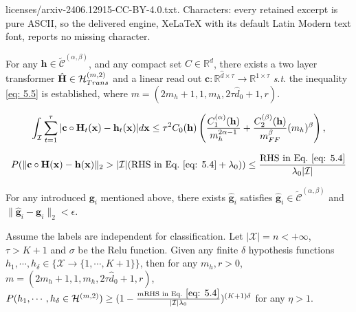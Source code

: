 \documentclass[10pt,a4paper]{amsart}
\begin{document}
licenses/arxiv-2406.12915-CC-BY-4.0.txt. Characters: every retained excerpt is pure ASCII, so the delivered engine, XeLaTeX with its default Latin Modern text font, reports no missing character.
\begin{lemma}
    For any $\mathbf{h}\in \widetilde{\mathcal{C}}^{(\alpha, \beta)}$, and any compact set $C\in \mathbb{R}^d$, there exists a two layer transformer $\hat{\mathbf{H}} \in \mathcal{H}_{\rm Trans}^{(m,2)}$ and a linear read out $\mathbf{c}:\mathbb{R}^{\hat{d}\times \tau}\xrightarrow{}\mathbb{R}^{1\times \tau}$ \textit{s}.\textit{t}. the inequality \eqref{eq: 5.5} is established,
    where $m=(2m_h+1,1,m_h,2\tau \hat{d}_0+1,r)$.
    \label{Jackson lemma1}
\end{lemma}

    \begin{equation}        \int_{\mathcal{I}}\sum_{t=1}^{\tau}|\mathbf{c}\circ\mathbf{H}_t(\mathbf{x})-\mathbf{h}_t(\mathbf{x})|d\mathbf{x}
        \leq \tau^2 C_0(\mathbf{h} )
        \left(\frac{C_1^{(\alpha)}(\mathbf{h} )}{m_h^{2\alpha-1}}+\frac{C_2^{(\beta )}(\mathbf{h})}{m_{\rm FF}^{\beta}}(m_h)^{\beta}\right),
        \label{eq: 5.4}
    \end{equation}

    \begin{equation}   
    P(\|\mathbf{c}\circ\mathbf{H}(\mathbf{x})-\mathbf{h}(\mathbf{x})\|_2>|\mathcal{I}|(\text{RHS~in~Eq.}~\eqref{eq: 5.4}+\lambda_0))\leq\frac{\text{RHS~in~Eq.}~\eqref{eq: 5.4}}{\lambda_0|\mathcal{I}|}
    \label{eq: 5.5}
    \end{equation}

\begin{lemma}
    For any introduced $\mathbf{g}_i$ mentioned above, there exists $\hat{\mathbf{g}}_i$ satisfies $\hat{\mathbf{g}}_i \in \widetilde{\mathcal{C}}^{(\alpha, \beta)}$ and $\|\hat{\mathbf{g}}_i-\mathbf{g}_i\|_2<\epsilon$.
    \label{Lemma 4}
\end{lemma}

\begin{lemma}
    Assume the labels are independent for classification. Let $|\mathcal{X}|=n<+\infty$, $\tau>K+1$ and $\sigma$ be the {\rm Relu} function. Given any finite $\delta$ hypothesis functions $h_1,\cdots,h_{\delta}\in \{\mathcal{X}\xrightarrow{}\{1,\cdots,K+1\}\}$, then for any $m_h,r>0$, $m=(2m_h+1,1,m_h,2\tau \hat{d}_0+1,r)$, $P(h_1,\cdots,h_{\delta}\in \mathcal{H}^{(m,2)})\geq (1-\frac{m\text{RHS~in~Eq.}~\eqref{eq: 5.4}}{|\mathcal{I}|\lambda_0})^{(K+1)\delta}$ for any $\eta>1$.
    \label{Lemma 5}
\end{lemma}
\end{document}
